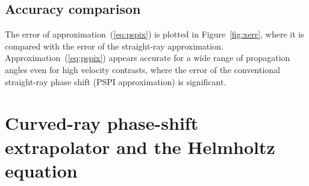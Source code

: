\subsection{Accuracy comparison}


The error of approximation~(\ref{eq:pspix}) is plotted in
Figure~\ref{fig:xerr}, where it is compared with the error of the straight-ray
approximation. Approximation~(\ref{eq:pspix}) appears accurate for a wide
range of propagation angles even for high velocity contrasts, where the error
of the conventional straight-ray phase shift (PSPI approximation) is
significant.


\newpage




\newpage

\section{Curved-ray phase-shift extrapolator and the Helmholtz equation}

